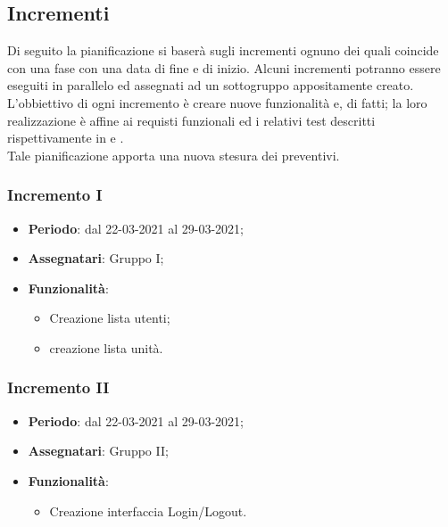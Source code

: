  \newpage

 \subsection{Incrementi}
 Di seguito la pianificazione si baserà sugli incrementi ognuno dei quali coincide con una fase con una data di fine e di inizio. Alcuni incrementi potranno essere eseguiti in parallelo ed assegnati ad un sottogruppo appositamente creato. \\
  L'obbiettivo di ogni incremento è creare nuove funzionalità e, di fatti; la loro realizzazione è affine ai requisti funzionali ed i relativi test descritti rispettivamente in  e .\\
 Tale pianificazione apporta una nuova stesura dei preventivi.

 \subsubsection{Incremento I}
  \begin{itemize}
  	\item \textbf{Periodo}: dal 22-03-2021 al 29-03-2021;
  	\item \textbf{Assegnatari}: Gruppo I;
  	\item \textbf{Funzionalità}:
  		\begin{itemize}
  		\item Creazione lista utenti;
  		\item creazione lista unità.
  	    \end{itemize}
  \end{itemize}

 \subsubsection{Incremento II}
 \begin{itemize}
 	\item \textbf{Periodo}: dal 22-03-2021 al 29-03-2021;
 	\item \textbf{Assegnatari}: Gruppo II;
 	\item \textbf{Funzionalità}:
 	\begin{itemize}
 		\item Creazione interfaccia Login/Logout.
 	\end{itemize}
 \end{itemize}


